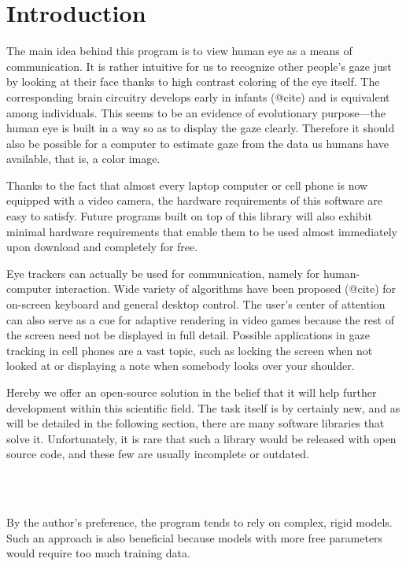 \chapter{Introduction}

The main idea behind this program is to view human eye as a means of communication.
It is rather intuitive for us to recognize other people's gaze just by looking at their face thanks to high contrast coloring of the eye itself.
The corresponding brain circuitry develops early in infants (@cite) and is equivalent among individuals.
This seems to be an evidence of evolutionary purpose---the human eye is built in a way so as to display the gaze clearly.
Therefore it should also be possible for a computer to estimate gaze from the data us humans have available, that is, a color image.

Thanks to the fact that almost every laptop computer or cell phone is now equipped with a video camera, the hardware requirements of this software are easy to satisfy.
Future programs built on top of this library will also exhibit minimal hardware requirements that enable them to be used almost immediately upon download and completely for free.

Eye trackers can actually be used for communication, namely for human-computer interaction.
Wide variety of algorithms have been proposed (@cite) for on-screen keyboard and general desktop control.
The user's center of attention can also serve as a cue for adaptive rendering in video games because the rest of the screen need not be displayed in full detail.
Possible applications in gaze tracking in cell phones are a vast topic, such as locking the screen when not looked at or displaying a note when somebody looks over your shoulder.

Hereby we offer an open-source solution in the belief that it will help further development within this scientific field.
The task itself is by certainly new, and as will be detailed in the following section, there are many software libraries that solve it.
Unfortunately, it is rare that such a library would be released with open source code, and these few are usually incomplete or outdated.

\\
\\

By the author's preference, the program tends to rely on complex, rigid models.
Such an approach is also beneficial because models with more free parameters would require too much training data.

